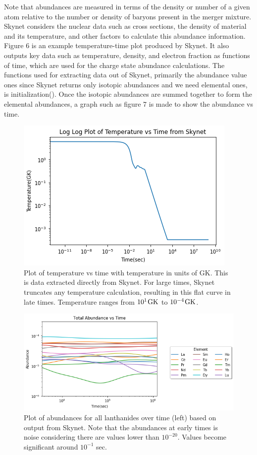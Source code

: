\documentclass[11pt,a4paper]{article}
\begin{document}
Note that abundances are measured in terms of the density or number of a given atom relative to the number or density of baryons present in the merger mixture. Skynet considers the nuclear data such as cross sections, the density of material and its temperature, and other factors to calculate this abundance information. Figure 6 is an example temperature-time plot produced by Skynet. It also outputs key data such as temperature, density, and electron fraction as functions of time, which are used for the charge state abundance calculations. The functions used for extracting data out of Skynet, primarily the abundance value ones since Skynet returns only isotopic abundances and we need elemental ones, is initialization(). Once the isotopic abundances are summed together to form the elemental abundances, a graph such as figure 7 is made to show the abundance vs time. 

\begin{figure}[h!]
  \includegraphics[scale = .75]{skynet_non_linear.png}
  \centering
  \caption{Plot of temperature vs time with temperature in units of GK. This is data extracted directly from Skynet. For large times, Skynet truncates any temperature calculation, resulting in this flat curve in late times. Temperature ranges from $10^1 \hspace{.03 cm} \mathrm{GK}$ to $10^{-4} \hspace{.03 cm} \mathrm{GK}$.}
\end{figure}

\begin{figure}[h!]
  \includegraphics[scale = .65]{elemental.png}
  \centering
  \caption{Plot of abundances for all lanthanides over time (left) based on output from Skynet. Note that the abundances at early times is noise considering there are values lower than $10^{-20}$. Values become significant around $10^{-1}$ sec.}
\end{figure} 
\end{document}
